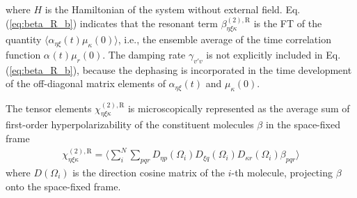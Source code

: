 where $H$ is the Hamiltonian of the system without external field. 
Eq.\thinspace(\ref{eq:beta_R_b}) indicates that the resonant term $\beta_{\eta\xi\kappa}^{(2),\text{R}}$ is the FT 
of the quantity $\langle\alpha_{\eta\xi}(t)\mu_{\kappa}(0)\rangle$, i.e., the ensemble average of the time correlation function $\alpha_{}(t)\mu_{r}(0)$.
The damping rate $\gamma_{v'v}$ is not explicitly included in Eq.\thinspace(\ref{eq:beta_R_b}), because the dephasing is incorporated in the time development of the off-diagonal matrix elements 
of $\alpha_{\eta\xi}(t)$ and $\mu_{\kappa}(0)$.

The tensor elements $\chi^{(2),\text{R}}_{\eta\xi\kappa}$ is microscopically represented as the average sum of first-order hyperpolarizability of the constituent molecules $\beta$ in the space-fixed frame
\begin{align}
  \chi^{(2),\text{R}}_{\eta\xi\kappa} = \langle \sum_i^N \sum_{pqr} D_{\eta p}(\Omega_i) D_{\xi q}(\Omega_i) D_{\kappa r}(\Omega_i) \beta_{pqr}\rangle
\label{average_sum}
\end{align}
where $D(\Omega_i)$ is the direction cosine matrix of the $i$-th molecule, projecting $\beta$ onto the space-fixed frame\cite{Morita2000}.

